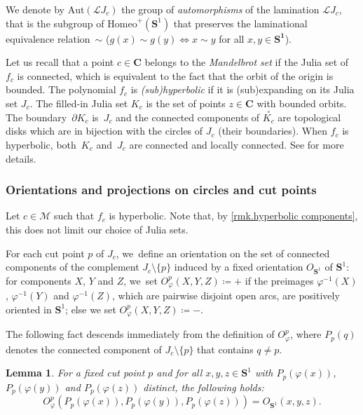 \documentclass[JEP,XML,SOM,Unicode,NoFloatCountersInSection,published]{cedram}
\theoremstyle{plain}
\newtheorem{lemma}[theorem]{Lemma}
\theoremstyle{definition}
\theoremstyle{remark}
\newcommand{\Aut}{\mathrm{Aut}}
\newcommand{\Homeo}{\mathrm{Homeo}}
\newcommand{\interior}[1]{\overset{\circ}{#1}}
\begin{document}
We denote by $\Aut(\mathcal{L}J_c)$ the group of \emph{automorphisms} of the lamination $\mathcal{L}J_c$, that is the subgroup of $\Homeo^+(\mathbf{S}^1)$ that preserves the laminational equivalence relation~$\sim$ (\ie $g(x)\sim g(y)\iff x\sim y$ for all $x,y\in\mathbf{\mathbf{S}^1}$).

Let us recall that a point $c\in\mathbf{C}$ belongs to the \emph{Mandelbrot set} if the Julia set of $f_c$ is connected, which is equivalent to the fact that the orbit of the origin is bounded.
The polynomial $f_c$ is \emph{(sub)hyperbolic} if it is (sub)expanding on its Julia set $J_c$.
The filled-in Julia set $K_c$ is the set of points $z\in\mathbf{C}$ with bounded orbits.
The boundary~$\partial K_c$ is~$J_c$ and the connected components of $\interior{K_c}$ are topological disks which are in bijection with the circles of $J_c$ (their boundaries).
When $f_c$ is hyperbolic, both~$K_c$ and~$J_c$ are connected and locally connected.
See \cite[Exp.\,III]{douady-hubbard-I} for more details.

\subsubsection{Orientations and projections on circles and cut points}

Let $c\in\mathcal{M}$ such that $f_c$ is hyperbolic.
Note that, by \cref{rmk.hyperbolic components}, this does not limit our choice of Julia sets.

For each cut point $p$ of $J_c$, we~define an orientation on the set of connected components of the complement $J_c \setminus \{p\}$ induced by a fixed orientation $O_{\mathbf{S}^1}$ of $\mathbf{S}^1$:
for components $X$, $Y$ and $Z$, we~set $O_\varphi^p(X,Y,Z) \coloneqq +$ if the preimages $\varphi^{-1}(X)$, $\varphi^{-1}(Y)$ and $\varphi^{-1}(Z)$, which are pairwise disjoint open arcs, are positively oriented in $\mathbf{S}^1$;
else we set $O_\varphi^p(X,Y,Z) \coloneqq -$.

The following fact descends immediately from the definition of $O_\varphi^p$, where $P_p(q)$ denotes the connected component of $J_c\setminus\{p\}$ that contains $q\neq p$.

\begin{lemma}
\label{lem.cut.points.projection}
For a fixed cut point $p$ and for all $x, y, z \in \mathbf{S}^1$ with $P_p (\varphi(x))$, $P_p(\varphi(y))$ and $P_p(\varphi(z))$ distinct, the following holds:
\[
 O_\varphi^p(P_p (\varphi(x)), P_p(\varphi(y)), P_p(\varphi(z))) = O_{\mathbf{S}^1}(x,y,z). 
\]
\end{lemma}
\end{document}
